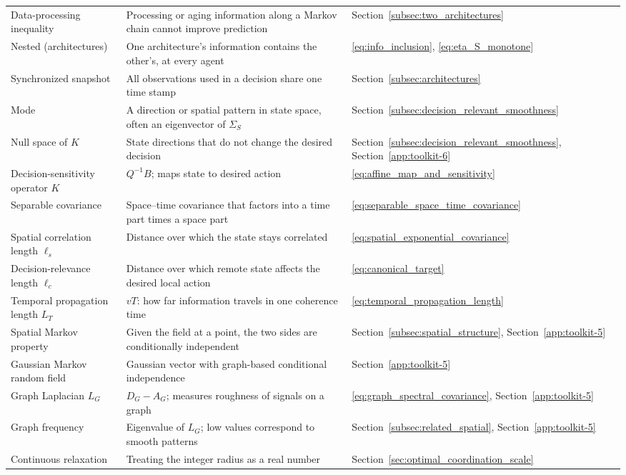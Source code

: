 \begin{longtable}{@{}p{.23\linewidth}p{.52\linewidth}p{.20\linewidth}@{}}
Data-processing inequality & Processing or aging information along a Markov chain cannot improve prediction & Section~\ref{subsec:two_architectures} \\
Nested (architectures) & One architecture's information contains the other's, at every agent & \eqref{eq:info_inclusion}, \eqref{eq:eta_S_monotone} \\
Synchronized snapshot & All observations used in a decision share one time stamp & Section~\ref{subsec:architectures} \\
Mode & A direction or spatial pattern in state space, often an eigenvector of $\Sigma_S$ & Section~\ref{subsec:decision_relevant_smoothness} \\
Null space of $K$ & State directions that do not change the desired decision & Section~\ref{subsec:decision_relevant_smoothness}, Section~\ref{app:toolkit-6} \\
Decision-sensitivity operator $K$ & $Q^{-1}B$; maps state to desired action & \eqref{eq:affine_map_and_sensitivity} \\
Separable covariance & Space--time covariance that factors into a time part times a space part & \eqref{eq:separable_space_time_covariance} \\
Spatial correlation length $\ell_s$ & Distance over which the state stays correlated & \eqref{eq:spatial_exponential_covariance} \\
Decision-relevance length $\ell_c$ & Distance over which remote state affects the desired local action & \eqref{eq:canonical_target} \\
Temporal propagation length $L_T$ & $vT$: how far information travels in one coherence time & \eqref{eq:temporal_propagation_length} \\
Spatial Markov property & Given the field at a point, the two sides are conditionally independent & Section~\ref{subsec:spatial_structure}, Section~\ref{app:toolkit-5} \\
Gaussian Markov random field & Gaussian vector with graph-based conditional independence & Section~\ref{app:toolkit-5} \\
Graph Laplacian $L_G$ & $D_G-A_G$; measures roughness of signals on a graph & \eqref{eq:graph_spectral_covariance}, Section~\ref{app:toolkit-5} \\
Graph frequency & Eigenvalue of $L_G$; low values correspond to smooth patterns & Section~\ref{subsec:related_spatial}, Section~\ref{app:toolkit-5} \\
Continuous relaxation & Treating the integer radius as a real number & Section~\ref{sec:optimal_coordination_scale} \\

\end{longtable}
